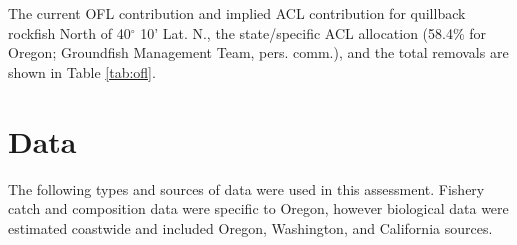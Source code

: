 \documentclass[11pt,
  english,
  a4paper,
]{article}
\begin{document}
\leavevmode\tagmcend\tagstructend\par


The current OFL contribution and implied ACL contribution for quillback rockfish North of 40{\(^\circ\)\leavevmode\tagmcend\tagstructend} 10' Lat. N., the state/specific ACL allocation (58.4\% for Oregon; Groundfish Management Team, pers. comm.), and the total removals are shown in Table \ref{tab:ofl}.

\leavevmode\tagmcend\tagstructend\par


\hypertarget{data}{%
\section{Data}\label{data}}

\leavevmode\tagmcend\tagstructend


The following types and sources of data were used in this assessment. Fishery catch and composition data were specific to Oregon, however biological data were estimated coastwide and included Oregon, Washington, and California sources.

\leavevmode\tagmcend\tagstructend\par

\end{document}
